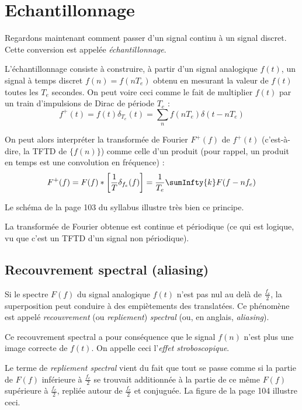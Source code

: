 \chapter{Echantillonnage}
    Regardons maintenant comment passer d'un signal continu à un signal discret. Cette conversion est appelée \textit{échantillonnage}.

    L'échantillonnage consiste à construire, à partir d'un signal analogique $f(t)$, un signal à temps discret $f(n) = f(nT_e)$ obtenu en mesurant la valeur de $f(t)$ toutes les $T_e$ secondes. On peut voire ceci comme le fait de multiplier $f(t)$ par un train d'impulsions de Dirac de période $T_e$ :
    $$
        f^+(t) = f(t)\delta_{T_e}(t) = \sum_n f(nT_e)\delta(t - nT_e)
    $$

    On peut alors interpréter la transformée de Fourier $F^+(f)$ de $f^+(t)$ (c'est-à-dire, la TFTD de $\{f(n)\}$) comme celle d'un produit (pour rappel, un produit en temps est une convolution en fréquence) :
    $$
        F^+(f) = F(f) * \left[\frac{1}{T}\delta_{f_e}(f)\right] = \frac{1}{T_e} \sumInfty{k} F(f - nf_e)
    $$

    Le schéma de la page 103 du syllabus illustre très bien ce principe.

    \begin{remarque}
        La transformée de Fourier obtenue est continue et périodique (ce qui est logique, vu que c'est un TFTD d'un signal non périodique).
    \end{remarque}

    \section{Recouvrement spectral (aliasing)}
        Si le spectre $F(f)$ du signal analogique $f(t)$ n'est pas nul au delà de $\frac{f_e}{2}$, la superposition peut conduire à des empiètements des translatées. Ce phénomène est appelé \textit{recouvrement} (ou \textit{repliement}) \textit{spectral} (ou, en anglais, \textit{aliasing}).

        Ce recouvrement spectral a pour conséquence que le signal $f(n)$ n'est plus une image correcte de $f(t)$. On appelle ceci l'\textit{effet stroboscopique}.

        Le terme de \textit{repliement spectral} vient du fait que tout se passe comme si la partie de $F(f)$ inférieure à $\frac{f_e}{2}$ se trouvait additionnée à la partie de ce même $F(f)$ supérieure à $\frac{f_e}{2}$, repliée autour de $\frac{f_e}{2}$ et conjuguée. La figure de la page 104 illustre ceci.


